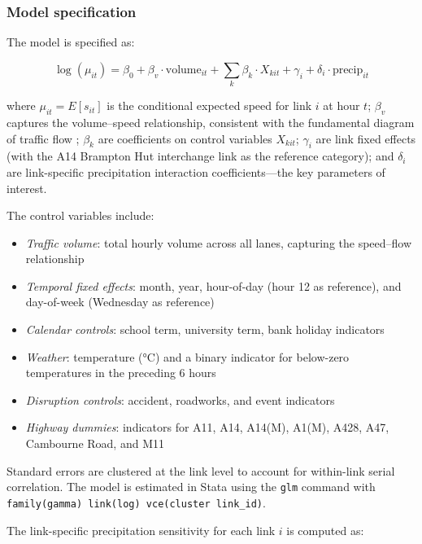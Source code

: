 \documentclass[review]{elsarticle}
\begin{document}
\subsubsection{Model specification}

The model is specified as:

\begin{equation}
\label{eq:glm}
\log(\mu_{it}) = \beta_0 + \beta_v \cdot \text{volume}_{it} + \sum_k \beta_k \cdot X_{kit} + \gamma_i + \delta_i \cdot \text{precip}_{it}
\end{equation}

\noindent where $\mu_{it} = E[s_{it}]$ is the conditional expected speed for link $i$ at hour $t$; $\beta_v$ captures the volume--speed relationship, consistent with the fundamental diagram of traffic flow \citep{greenshields1935study}; $\beta_k$ are coefficients on control variables $X_{kit}$; $\gamma_i$ are link fixed effects (with the A14 Brampton Hut interchange link as the reference category); and $\delta_i$ are link-specific precipitation interaction coefficients---the key parameters of interest.

The control variables include:

\begin{itemize}
    \item \textit{Traffic volume}: total hourly volume across all lanes, capturing the speed--flow relationship
    \item \textit{Temporal fixed effects}: month, year, hour-of-day (hour 12 as reference), and day-of-week (Wednesday as reference)
    \item \textit{Calendar controls}: school term, university term, bank holiday indicators
    \item \textit{Weather}: temperature (\si{\degreeCelsius}) and a binary indicator for below-zero temperatures in the preceding 6 hours
    \item \textit{Disruption controls}: accident, roadworks, and event indicators
    \item \textit{Highway dummies}: indicators for A11, A14, A14(M), A1(M), A428, A47, Cambourne Road, and M11
\end{itemize}

Standard errors are clustered at the link level to account for within-link serial correlation. The model is estimated in Stata using the \texttt{glm} command with \texttt{family(gamma) link(log) vce(cluster link\_id)}.

The link-specific precipitation sensitivity for each link $i$ is computed as:
\end{document}
